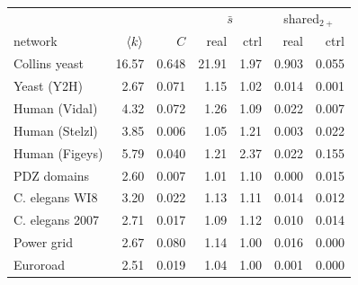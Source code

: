 \begin{tabular}{lrrrrrr}
\hline\hline
 & & & \multicolumn{2}{c}{$\bar s$} & \multicolumn{2}{c}{shared$_{2+}$}\\
network & $\langle k \rangle$ & $C$ & real & ctrl & real & ctrl\\
\hline
Collins yeast & 16.57 & 0.648 & 21.91 & 1.97 & 0.903 & 0.055\\
Yeast (Y2H) & 2.67 & 0.071 & 1.15 & 1.02 & 0.014 & 0.001\\
Human (Vidal) & 4.32 & 0.072 & 1.26 & 1.09 & 0.022 & 0.007\\
Human (Stelzl) & 3.85 & 0.006 & 1.05 & 1.21 & 0.003 & 0.022\\
Human (Figeys) & 5.79 & 0.040 & 1.21 & 2.37 & 0.022 & 0.155\\
PDZ domains & 2.60 & 0.007 & 1.01 & 1.10 & 0.000 & 0.015\\
C. elegans WI8 & 3.20 & 0.022 & 1.13 & 1.11 & 0.014 & 0.012\\
C. elegans 2007 & 2.71 & 0.017 & 1.09 & 1.12 & 0.010 & 0.014\\
Power grid & 2.67 & 0.080 & 1.14 & 1.00 & 0.016 & 0.000\\
Euroroad & 2.51 & 0.019 & 1.04 & 1.00 & 0.001 & 0.000\\
\hline\hline
\end{tabular}

